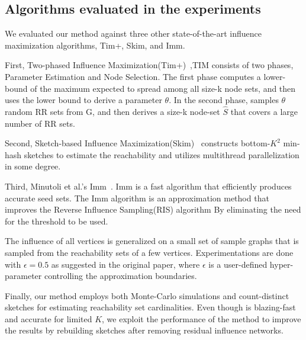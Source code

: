 \documentclass[10pt,journal,compsoc]{IEEEtran}
\newcommand\acro{{\sc{HyperFuseR\xspace}\xspace}\xspace}
\begin{document}
\subsection{Algorithms evaluated in the experiments}

We evaluated our method against three other state-of-the-art influence maximization algorithms, {\sc Tim+}, {\sc Skim}, and {\sc Imm}.

First, Two-phased Influence Maximization({\sc Tim+})~\cite{tim},TIM consists of two phases, Parameter Estimation and Node Selection. The first phase computes a lower-bound
of the maximum expected to spread among all size-k node sets,
and then uses the lower bound to derive a parameter $\theta$. In the second phase, samples $\theta$ random RR sets from
G, and then derives a size-k node-set $\hat{S}$ that covers a large number of RR sets.

Second, Sketch-based Influence Maximization({\sc Skim})~\cite{cohen2014sketch} constructs bottom-$K^2$ min-hash sketches to estimate the reachability and utilizes multithread parallelization in some degree. 

Third, Minutoli et al.'s {\sc Imm}~\cite{minutoli2019fast}. 
{\sc Imm} is a fast algorithm that efficiently produces accurate seed sets. 
The {\sc Imm}  algorithm\cite{tang2015influence} is an approximation method that improves the Reverse Influence Sampling(RIS)\cite{borgs2014maximizing} algorithm By eliminating the need for the threshold to be used.

The influence of all vertices is generalized on a small set of sample graphs that is sampled from the reachability sets of a few vertices.  Experimentations are done with $\epsilon = 0.5$ as suggested in the original paper, where $\epsilon$ is a user-defined hyper-parameter controlling the approximation boundaries.

Finally, our method \acro employs both Monte-Carlo simulations and count-distinct sketches for estimating reachability set cardinalities. Even though \acro is blazing-fast and accurate for limited $K$, we exploit the performance of the method to improve the results by rebuilding sketches after removing residual influence networks.

\end{document}
